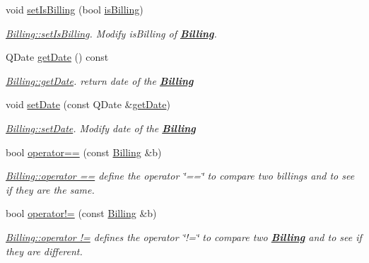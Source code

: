 \begin{DoxyCompactItemize}
void \hyperlink{classModels_1_1Billing_aff8b71426c02bc97f0a724ef762cd42e}{set\+Is\+Billing} (bool \hyperlink{classModels_1_1Billing_ab03dd29a9812a995355a1d93318f348f}{is\+Billing})
\begin{DoxyCompactList}\small\item\em \hyperlink{classModels_1_1Billing_aff8b71426c02bc97f0a724ef762cd42e}{Billing\+::set\+Is\+Billing}. Modify {\itshape is\+Billing} of {\bfseries \hyperlink{classModels_1_1Billing}{Billing}}. \end{DoxyCompactList}\item 
Q\+Date \hyperlink{classModels_1_1Billing_af0d1f0132d0902fb96456d0a9018b701}{get\+Date} () const 
\begin{DoxyCompactList}\small\item\em \hyperlink{classModels_1_1Billing_af0d1f0132d0902fb96456d0a9018b701}{Billing\+::get\+Date}. return date of the {\bfseries \hyperlink{classModels_1_1Billing}{Billing}} \end{DoxyCompactList}\item 
void \hyperlink{classModels_1_1Billing_ae8db0fe5fe273fad31e2f846b5b891cb}{set\+Date} (const Q\+Date \&\hyperlink{classModels_1_1Billing_af0d1f0132d0902fb96456d0a9018b701}{get\+Date})
\begin{DoxyCompactList}\small\item\em \hyperlink{classModels_1_1Billing_ae8db0fe5fe273fad31e2f846b5b891cb}{Billing\+::set\+Date}. Modify {\itshape date} of the {\bfseries \hyperlink{classModels_1_1Billing}{Billing}} \end{DoxyCompactList}\item 
bool \hyperlink{classModels_1_1Billing_af3d8818a1e00eaa707058567fccf045b}{operator==} (const \hyperlink{classModels_1_1Billing}{Billing} \&b)
\begin{DoxyCompactList}\small\item\em \hyperlink{classModels_1_1Billing_af3d8818a1e00eaa707058567fccf045b}{Billing\+::operator ==} define the operator \char`\"{}==\char`\"{} to compare two billings and to see if they are the same. \end{DoxyCompactList}\item 
bool \hyperlink{classModels_1_1Billing_ae6ff88e05384718d57be1be38f250a52}{operator!=} (const \hyperlink{classModels_1_1Billing}{Billing} \&b)
\begin{DoxyCompactList}\small\item\em \hyperlink{classModels_1_1Billing_ae6ff88e05384718d57be1be38f250a52}{Billing\+::operator !=} defines the operator \char`\"{}!=\char`\"{} to compare two {\bfseries \hyperlink{classModels_1_1Billing}{Billing}} and to see if they are different. \end{DoxyCompactList}\end{DoxyCompactItemize}
